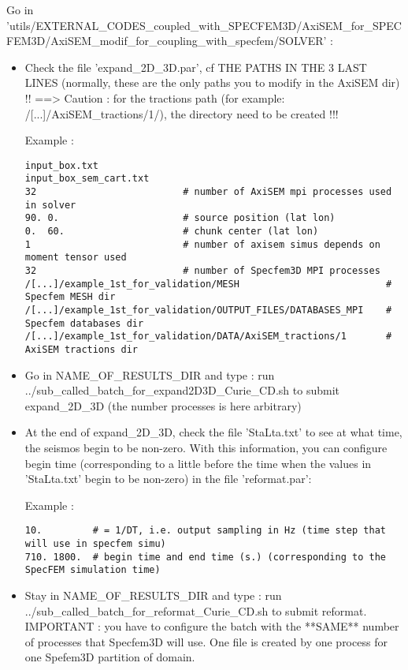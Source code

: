 \documentclass[11pt]{article}
\begin{document}
\bigskip

\noindent Go in {\scriptsize 'utils/EXTERNAL\_CODES\_coupled\_with\_SPECFEM3D/AxiSEM\_for\_SPECFEM3D/AxiSEM\_modif\_for\_coupling\_with\_specfem/SOLVER'} :

\medskip

\begin{itemize}

\item[\textbullet] {\color{red} Check the file 'expand\_2D\_3D.par', cf THE PATHS IN THE 3 LAST LINES (normally, these are the only paths you to modify in the AxiSEM dir) !!} ==> Caution : for the tractions path (for example: /[...]/AxiSEM\_tractions/1/), the directory need to be created !!!

\smallskip

\noindent Example :
\begin{verbatim}
input_box.txt
input_box_sem_cart.txt
32                          # number of AxiSEM mpi processes used in solver
90. 0.                      # source position (lat lon)
0.  60.                     # chunk center (lat lon)
1                           # number of axisem simus depends on moment tensor used
32                          # number of Specfem3D MPI processes
/[...]/example_1st_for_validation/MESH                          # Specfem MESH dir
/[...]/example_1st_for_validation/OUTPUT_FILES/DATABASES_MPI    # Specfem databases dir
/[...]/example_1st_for_validation/DATA/AxiSEM_tractions/1       # AxiSEM tractions dir
\end{verbatim}

\item[\textbullet] Go in NAME\_OF\_RESULTS\_DIR and type : run ../sub\_called\_batch\_for\_expand2D3D\_Curie\_CD.sh to submit expand\_2D\_3D (the number processes is here arbitrary)

\item[\textbullet] At the end of expand\_2D\_3D, check the file 'StaLta.txt' to see at what time, the seismos begin to be non-zero. With this information, you can {\color{red} configure} begin time (corresponding to a little before the time when the values in 'StaLta.txt' begin to be non-zero) {\color{red} in the file 'reformat.par'}:

\smallskip

\noindent Example :
\begin{verbatim}
10.         # = 1/DT, i.e. output sampling in Hz (time step that will use in specfem simu)
710. 1800.  # begin time and end time (s.) (corresponding to the SpecFEM simulation time)
\end{verbatim}

\item[\textbullet] Stay in NAME\_OF\_RESULTS\_DIR and type : run ../sub\_called\_batch\_for\_reformat\_Curie\_CD.sh to submit reformat. IMPORTANT : you have to configure the batch with the **SAME** number of processes that Specfem3D will use. One file is created by one process for one Spefem3D partition of domain.

\end{itemize}
\end{document}
